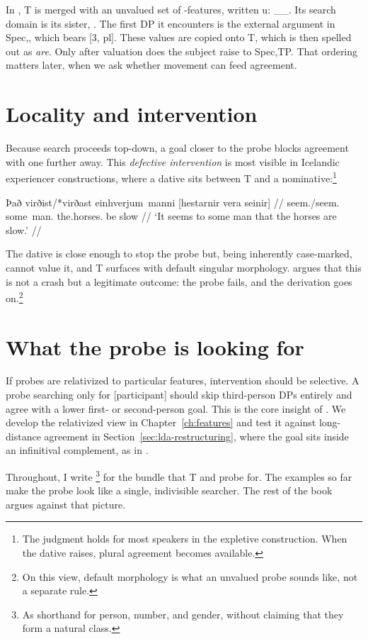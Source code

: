 In , T is merged with an unvalued set of \ph-features, written u\ph: \_\_. Its search domain is its sister, \vP. The first DP it encounters is the external argument in Spec,\vP, which bears [3, pl]. These values are copied onto T, which is then spelled out as \textit{are}. Only after valuation does the subject raise to Spec,TP. That ordering matters later, when we ask whether movement can feed agreement.

\section{Locality and intervention}\label{sec:intervention}

Because search proceeds top-down, a goal closer to the probe blocks agreement with one further away. This \emph{defective intervention} is most visible in Icelandic experiencer constructions, where a dative sits between T and a nominative:\footnote{The judgment holds for most speakers in the expletive construction. When the dative raises, plural agreement becomes available.}

\ex {}
\begingl
\gla Það virðist/*virðast einhverjum~manni [hestarnir vera seinir] //
\glb {} seem./seem. some~man. the.horses. be slow //
\glft `It seems to some man that the horses are slow.' \citep{holmberg2003} //
\endgl
\xe

The dative is close enough to stop the probe but, being inherently case-marked, cannot value it, and T surfaces with default singular morphology. \citet{preminger2014} argues that this is not a crash but a legitimate outcome: the probe fails, and the derivation goes on.\footnote{On this view, default morphology is what an unvalued probe sounds like, not a separate rule.}

\section{What the probe is looking for}\label{sec:relativized}

If probes are relativized to particular features, intervention should be selective. A probe searching only for [participant] should skip third-person DPs entirely and agree with a lower first- or second-person goal. This is the core insight of \citet{bejar2009}. We develop the relativized view in Chapter~\ref{ch:features} and test it against long-distance agreement in Section~\ref{sec:lda-restructuring}, where the goal sits inside an infinitival complement, as in .

Throughout, I write \ph\footnote{As shorthand for person, number, and gender, without claiming that they form a natural class.} for the bundle that T and \lv probe for. The examples so far make the probe look like a single, indivisible searcher. The rest of the book argues against that picture.
